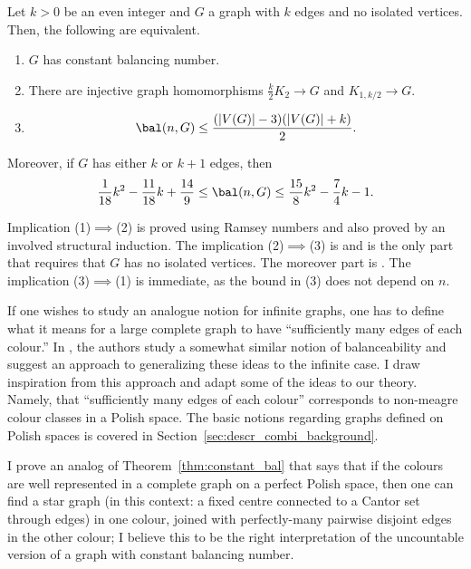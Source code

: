\begin{theorem}\label{thm:constant_bal}
    Let $k>0$ be an even integer and $G$ a graph with $k$ edges and no isolated vertices.
    Then, the following are equivalent.
    \begin{enumerate}
        \item $G$ has constant balancing number.

        \item There are injective graph homomorphisms $\frac k2K_2\to G$ and $K_{1,k/2}\to G$.
        
        \item $$\bal(n,G)\leq\frac{(|V(G)|-3)(|V(G)|+k)}2.$$ 
    \end{enumerate}

    Moreover, if $G$ has either $k$ or $k+1$ edges, then $$\frac1{18}k^2-\frac{11}{18}k+\frac{14}9\leq\bal(n,G)\leq\frac{15}8k^2-\frac74k-1.$$
\end{theorem}

Implication (1)$\implies$(2) is \cite[Theorem~3.6]{caro2022evolution} proved using Ramsey numbers and also \cite[Theorem~1.1]{Caroetal2023} proved by an involved structural induction.
The implication (2)$\implies$(3) is \cite[Theorem~3.7]{Caroetal2023} and is the only part that requires that $G$ has no isolated vertices.
The moreover part is \cite[Theorem~5.1]{Caroetal2023}.
The implication (3)$\implies$(1) is immediate, as the bound in (3) does not depend on $n$.

If one wishes to study an analogue notion for infinite graphs, one has to define what it means for a large complete graph to have ``sufficiently many edges of each colour.''
In \cite[Section~4]{bowen2020unavoidable}, the authors study a somewhat similar notion of balanceability and suggest an approach to generalizing these ideas to the infinite case.
I draw inspiration from this approach and adapt some of the ideas to our theory.
Namely, that ``sufficiently many edges of each colour'' corresponds to non-meagre colour classes in a Polish space.
The basic notions regarding graphs defined on Polish spaces is covered in Section~\ref{sec:descr_combi_background}.

I prove an analog of Theorem~\ref{thm:constant_bal} that says that if the colours are well represented in a complete graph on a perfect Polish space, then one can find a star graph (in this context: a fixed centre connected to a Cantor set through edges) in one colour, joined with perfectly-many pairwise disjoint edges in the other colour; I believe this to be the right interpretation of the uncountable version of a graph with constant balancing number.

